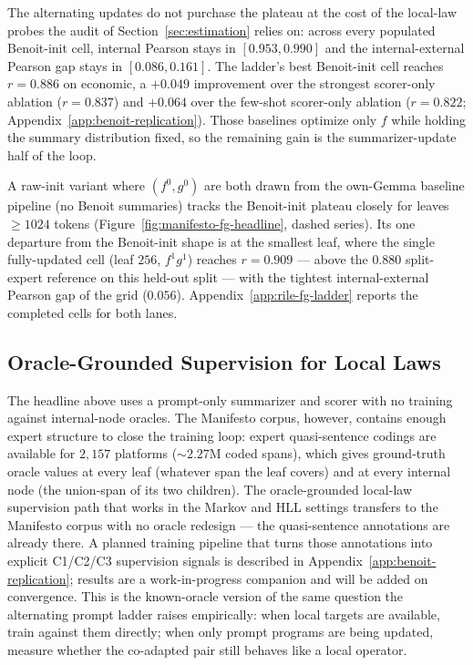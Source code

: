 The alternating updates do not purchase the plateau at the cost of
the local-law probes the audit of
Section~\ref{sec:estimation} relies on: across every populated
Benoit-init cell, internal Pearson stays in $[0.953, 0.990]$ and the
internal-external Pearson gap stays in $[0.086, 0.161]$. The ladder's
best Benoit-init cell reaches $r = 0.886$ on economic, a $+0.049$
improvement over the strongest scorer-only ablation ($r = 0.837$) and
$+0.064$ over the few-shot scorer-only ablation ($r = 0.822$;
Appendix~\ref{app:benoit-replication}). Those baselines optimize only
$f$ while holding the summary distribution fixed, so the remaining gain
is the summarizer-update half of the loop.
 

A raw-init variant where $(f^0, g^0)$ are both drawn from the
own-Gemma baseline pipeline (no Benoit summaries) tracks the
Benoit-init plateau closely for leaves $\geq 1024$ tokens
(Figure~\ref{fig:manifesto-fg-headline}, dashed series). Its one
departure from the Benoit-init shape is at the smallest leaf, where
the single fully-updated cell (leaf $256$, $f^1 g^1$) reaches
$r = 0.909$ --- above the $0.880$ split-expert reference on this
held-out split --- with the tightest internal-external Pearson gap
of the grid ($0.056$). Appendix~\ref{app:rile-fg-ladder} reports
the completed cells for both lanes.

\subsection{Oracle-Grounded Supervision for Local Laws}\label{sec:rile-oracle}

The headline above uses a prompt-only summarizer and scorer with no
training against internal-node oracles. The Manifesto corpus, however,
contains enough expert structure to close the training loop: expert
quasi-sentence codings are available for $2{,}157$ platforms
($\sim\!2.27$M coded spans), which gives ground-truth oracle values at
every leaf (whatever span the leaf covers) and at every internal node
(the union-span of its two children). The oracle-grounded local-law
supervision path that works in the Markov and HLL settings transfers
to the Manifesto corpus with no oracle redesign --- the quasi-sentence
annotations are already there. A planned training pipeline that turns
those annotations into explicit C1/C2/C3 supervision signals is
described in Appendix~\ref{app:benoit-replication}; results are a
work-in-progress companion and will be added on convergence. This is the
known-oracle version of the same question the alternating prompt ladder
raises empirically: when local targets are available, train against them
directly; when only prompt programs are being updated, measure whether
the co-adapted pair still behaves like a local operator.

